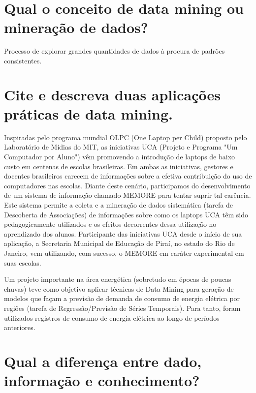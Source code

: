 \section{Qual o conceito de data mining ou mineração de dados?}

Processo de explorar grandes quantidades de dados à procura de padrões consistentes.
\cite{CetaxDeal}

\section{Cite e descreva duas aplicações práticas de data mining.}


Inspiradas pelo programa mundial OLPC (One Laptop per Child) proposto pelo Laboratório de Mídias do MIT, as iniciativas UCA (Projeto e Programa "Um Computador por Aluno") vêm promovendo a introdução de laptops de baixo custo em centenas de escolas brasileiras. Em ambas as iniciativas, gestores e docentes brasileiros carecem de informações sobre a efetiva contribuição do uso de computadores nas escolas. Diante deste cenário, participamos do desenvolvimento de um sistema de informação chamado MEMORE para tentar suprir tal carência. Este sistema permite a coleta e a mineração de dados sistemática (tarefa de Descoberta de Associações) de informações sobre como os laptops UCA têm sido pedagogicamente utilizados e os efeitos decorrentes dessa utilização no aprendizado dos alunos. Participante das iniciativas UCA desde o início de sua aplicação, a Secretaria Municipal de Educação de Piraí, no estado do Rio de Janeiro, vem utilizando, com sucesso, o MEMORE em caráter experimental em suas escolas.  
\newline


Um projeto importante na área energética (sobretudo em épocas de poucas chuvas) teve como objetivo aplicar técnicas de Data Mining para geração de modelos que façam a previsão de demanda de consumo de energia elétrica por regiões (tarefa de Regressão/Previsão de Séries Temporais). Para tanto, foram utilizados registros de consumo de energia elétrica ao longo de períodos anteriores.
\cite{ComputerWorld}

\section{Qual a diferença entre dado, informação e conhecimento?}

